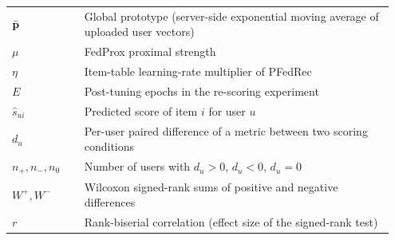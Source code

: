 \begin{longtable}{@{}p{0.18\linewidth}p{0.77\linewidth}@{}}
$\bar{\mathbf{p}}$ & Global prototype (server-side exponential moving average of uploaded user vectors) \\
$\mu$ & FedProx proximal strength \\
$\eta$ & Item-table learning-rate multiplier of PFedRec \\
$E$ & Post-tuning epochs in the re-scoring experiment \\
$\hat{s}_{ui}$ & Predicted score of item $i$ for user $u$ \\
$d_u$ & Per-user paired difference of a metric between two scoring conditions \\
$n_+, n_-, n_0$ & Number of users with $d_u > 0$, $d_u < 0$, $d_u = 0$ \\
$W^+, W^-$ & Wilcoxon signed-rank sums of positive and negative differences \\
$r$ & Rank-biserial correlation (effect size of the signed-rank test) \\
\end{longtable}
